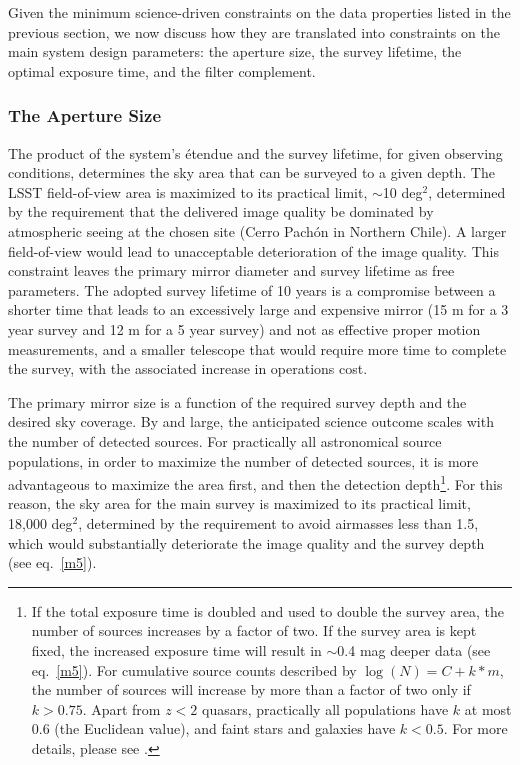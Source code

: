 Given the minimum science-driven constraints on the data properties listed
in the previous section, we now discuss how they are translated into
constraints on the main system design parameters: the aperture size,
the survey lifetime, the optimal exposure time, and the filter complement.


\subsubsection{The Aperture Size }
\label{Sec:apSize}
The product of the system's \'etendue and the survey lifetime, for given
observing conditions, determines
the sky area that can be surveyed to a given depth.
The
LSST field-of-view area is maximized to its practical limit, $\sim$10 deg$^2$,
determined by the requirement that the delivered image quality be dominated
by atmospheric seeing at the chosen site (Cerro Pach\'{o}n in Northern Chile).
A larger field-of-view would lead to unacceptable deterioration of the
image quality. This constraint leaves the primary mirror diameter and survey lifetime
as free parameters. The adopted survey lifetime of 10 years is a compromise
between a shorter time that leads to an excessively large and expensive mirror (15 m for a
3 year survey and 12 m for a 5 year survey) and not as effective proper motion
measurements, and a smaller telescope that would require more time to complete the
survey, with the associated increase in operations cost.

The primary mirror size is a function of the required survey depth and the
desired sky coverage. By and large, the anticipated science outcome scales
with the number of detected sources. For practically all astronomical source
populations, in order to maximize the number of detected sources, it is more
advantageous to maximize the area first, and then
the detection depth\footnote{
If the total exposure time is doubled and used to double the survey area,
the number of sources increases by a factor of two. If the survey
area is kept fixed, the increased exposure time will result in
$\sim$0.4 mag deeper data (see eq.~\ref{m5}). For cumulative source
counts described by $\log(N) = C + k*m$, the number of sources
will increase by more than a factor of two only if $k>0.75$.
Apart from $z<2$ quasars, practically all populations
have $k$ at most 0.6 (the Euclidean value), and faint stars
and galaxies have $k<0.5$. For more details, please see \citet{2003AJ....125.2740N}.}.
For this reason, the sky area for the main survey is
maximized to its practical limit, 18,000 deg$^2$, determined by the
requirement to avoid airmasses less than 1.5,
which would substantially
deteriorate the image quality and the survey depth (see eq.~\ref{m5}).

